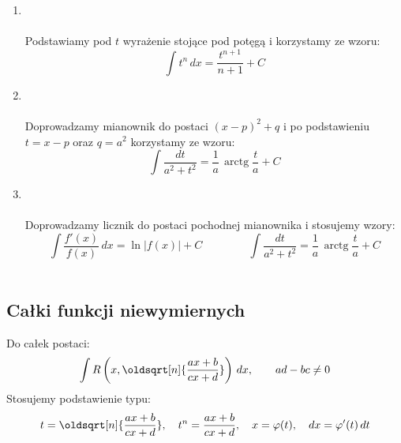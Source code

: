 \documentclass[10pt, twoside, fleqn]{article}
\renewcommand*{\sqrt}[2][\ ]{\oldsqrt[#1]{#2}}
\DeclareMathOperator{\arctg}{arctg}
\begin{document}
\begin{enumerate}
\begin{enumerate}
				\item {} \\ \\
				Podstawiamy pod $t$ wyrażenie stojące pod potęgą i korzystamy
				ze wzoru:
				\begin{equation*}
					\int{t^{n}\,dx}=\frac{t^{n+1}}{n+1}+C
				\end{equation*}			
			
			\item {} \\ \\
				Doprowadzamy mianownik do postaci $(x-p)^2 + q$ i po podstawieniu
				$t=x-p$ oraz $q=a^2$ korzystamy ze wzoru:
				\begin{equation*}
					\int{\frac{dt}{a^2+t^2}}=
					\frac{1}{a}\,\arctg{\frac{t}{a}}+C
				\end{equation*}
			
			\item {} \\ \\
				Doprowadzamy licznik do postaci pochodnej mianownika i stosujemy 
				wzory:
				\begin{equation*}
					\int{\frac{f'(x)}{f(x)}\,dx}=
					\ln{\left|f(x)\right|}+C
						\hspace{50pt}
					\int{\frac{dt}{a^2+t^2}}=\frac{1}{a}\,\arctg{\frac{t}{a}}+C
				\end{equation*} \\
				
			\end{enumerate}
		
		\end{enumerate}
		
	\newpage		
	\subsection{Całki funkcji niewymiernych}
		
		Do całek postaci:
%
			\begin{equation*}
				\int{R \left( x,\sqrt[n]{\frac{ax+b}{cx+d}} \right) \, dx}, 
					\hspace{20pt} ad-bc\neq 0
				\end{equation*}
%
		Stosujemy podstawienie typu:
%			
			\begin{equation*}
				t=\sqrt[n]{\frac{ax+b}{cx+d}}, \hspace{10pt} 
				t^n=\frac{ax+b}{cx+d}, \hspace{10pt} x=\varphi(t), \hspace{10pt}
				dx=\varphi'(t)\,dt
			\end{equation*}
\end{document}
